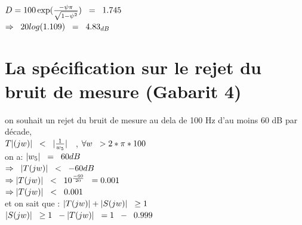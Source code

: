 \documentclass[12pt, a4paper, openany]{report}
\begin{document}
$ D=100\exp(\frac{-\psi\pi}{\sqrt{1-\psi^{2}}})  \hspace{0.2cm}=\hspace{0.2cm} 1.745$ \\

$\Rightarrow \hspace{0.2cm} 20log(1.109)\hspace{0.2cm} = \hspace{0.2cm} 4.83_{dB} $\\



\section{La spécification sur le rejet du bruit de mesure (Gabarit 4)}

on souhait un rejet du bruit de mesure au dela de 100 Hz d'au moins 60 dB par décade, \\

$ T|(jw)|\hspace{0.2cm}<\hspace{0.2cm} |\frac{1}{w_{5}}|  \hspace{0.2cm}$ , $\forall w\hspace{0.2cm}>2*\pi*100$ \\

on a: $|w_{5}|\hspace{0.2cm}=\hspace{0.2cm}  60dB $\\
$\Rightarrow \hspace{0.2cm} |T(jw)|\hspace{0.2cm}<\hspace{0.2cm}-60 dB $\\

$\Rightarrow |T(jw)| \hspace{0.2cm}<\hspace{0.2cm} 10^{\frac{-60}{20}} \hspace{0.2cm}=0.001$\\

$\Rightarrow |T(jw)| \hspace{0.2cm}<\hspace{0.2cm} 0.001 $\\

et on sait que : $|T(jw)|+|S(jw)| \hspace{0.2cm} \geq 1$ \\

  $|S(jw)|\hspace{0.2cm} \geq 1\hspace{0.2cm}-|T(jw)| \hspace{0.2cm} = 1\hspace{0.2cm}-\hspace{0.2cm}0.999 $ \\
  
\end{document}
